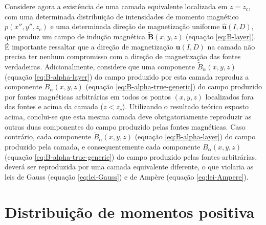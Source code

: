 Considere agora a existência de uma camada equivalente localizada em $z = z_{c}$, com uma determinada 
distribuição de intensidades de momento magnético $p(x'', y'', z_{c})$ e uma determinada 
direção de magnetização uniforme $\hat{\mathbf{u}}(I, D)$, que produz um campo de indução 
magnética $\tilde{\mathbf{B}}(x, y, z)$ (equação \ref{eq:B-layer}). 
É importante ressaltar que a direção de magnetização $\hat{\mathbf{u}}(I, D)$ na camada não 
precisa ter nenhum compromisso com a direção de magnetização das fontes verdadeiras.
Adicionalmente, 
considere que uma componente $\tilde{B}_{\alpha}(x, y, z)$ (equação \ref{eq:B-alpha-layer}) 
do campo produzido por esta camada reproduz a componente $B_{\alpha}(x, y, z)$ (equação \ref{eq:B-alpha-true-generic}) 
do campo produzido por fontes magnéticas arbitrárias em todos os pontos $(x, y, z)$ localizados fora das fontes e acima 
da camada ($z < z_{c}$). Utilizando o resultado teórico exposto acima, conclui-se que 
esta mesma camada deve obrigatoriamente reproduzir as outras duas componentes do campo produzido 
pelas fontes magnéticas. Caso contrário, cada componente $\tilde{B}_{\alpha}(x, y, z)$ 
(equação \ref{eq:B-alpha-layer}) do campo produzido pela camada, e consequentemente cada componente 
$B_{\alpha}(x, y, z)$ (equação \ref{eq:B-alpha-true-generic}) do campo produzido pelas fontes arbitrárias, 
deverá ser reproduzida por uma camada equivalente diferente, o que violaria as leis de 
Gauss (equação \ref{eq:lei-Gauss}) e de Ampère (equação \ref{eq:lei-Ampere}).


\section{Distribuição de momentos positiva}
\label{sec:distribuicao-positiva}


